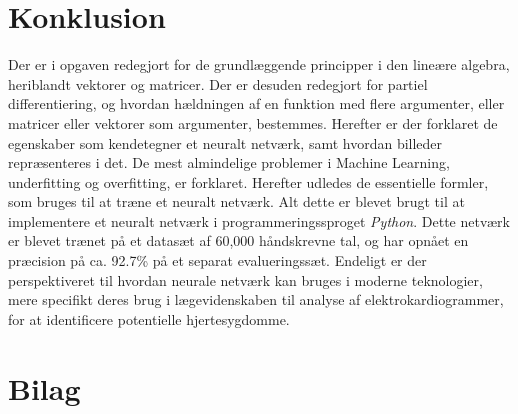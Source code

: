 \documentclass[a4paper, 12pt]{article}
\theoremstyle{definition}
\begin{document}
\section{Konklusion}
Der er i opgaven redegjort for de grundlæggende principper i den lineære algebra, heriblandt vektorer og matricer. Der er desuden redegjort for partiel differentiering, og hvordan hældningen af en funktion med flere argumenter, eller matricer eller vektorer som argumenter, bestemmes. Herefter er der forklaret de egenskaber som kendetegner et neuralt netværk, samt hvordan billeder repræsenteres i det. De mest almindelige problemer i Machine Learning, underfitting og overfitting, er forklaret. Herefter udledes de essentielle formler, som bruges til at træne et neuralt netværk. Alt dette er blevet brugt til at implementere et neuralt netværk i programmeringssproget \emph{Python}. Dette netværk er blevet trænet på et datasæt af 60,000 håndskrevne tal, og har opnået en præcision på ca. 92.7\% på et separat evalueringssæt. Endeligt er der perspektiveret til hvordan neurale netværk kan bruges i moderne teknologier, mere specifikt deres brug i lægevidenskaben til analyse af elektrokardiogrammer, for at identificere potentielle hjertesygdomme.

\newpage
\printbibliography

\newpage
\renewcommand{\thesection}{\Alph{section}}
\renewcommand{\thesubsection}{\thesection\arabic{subsection}}
\setcounter{section}{0}

\section{Bilag}
\end{document}
